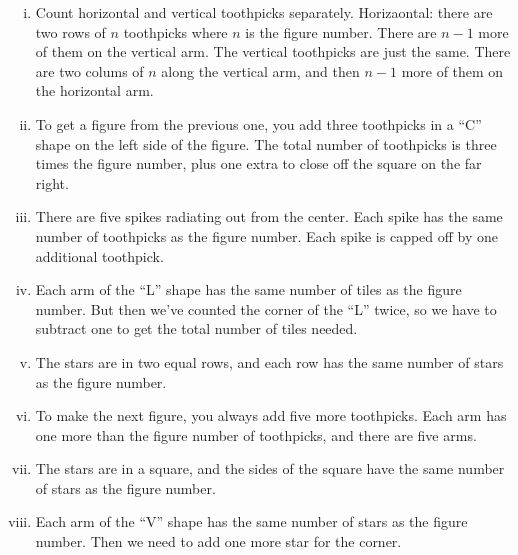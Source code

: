 \documentclass[12pt, reqno]{amsart}
\theoremstyle{remark}
\theoremstyle{definition}
\numberwithin{equation}{section}  %
\begin{document}
\begin{enumerate}[(i)]

\item
Count horizontal and vertical toothpicks separately.  Horizaontal: there are two rows of $n$ toothpicks where $n$ is the figure number.  There are $n-1$ more of them on the vertical arm.  The vertical toothpicks are just the same.  There are two colums of $n$ along the  vertical arm, and then $n-1$ more of them on the horizontal arm.\\



\item
 To get a figure from the previous one, you add three toothpicks in a ``C'' shape on the left side of the figure.  The total number of toothpicks is three times the figure number, plus one extra to close off the square on the far right.\\


\item
 There are five spikes radiating out from the center.  Each spike has the same number of toothpicks as the figure number.  Each spike is capped off by one additional toothpick.\\
 
 \item
Each arm of the ``L'' shape has the same number of tiles as the figure number.  But then we've counted the corner of the ``L'' twice, so we have to subtract one to get the total number of tiles needed.\\

\item
The stars are in two equal rows, and each row has the same number of stars as the figure number.\\

\item
To make the next figure, you always add five more toothpicks.  Each arm has one more than the figure number of toothpicks, and there are five arms.\\



\item
The stars are in a square, and the sides of the square have the same number of stars as the figure number.\\

\item
Each arm of the ``V'' shape has the same number of stars as the figure number.  Then we need to add one more star for the corner.\\



\end{enumerate}
\end{document}
